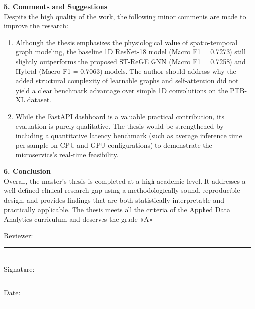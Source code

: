 \documentclass[12pt,a4paper]{article}
\begin{document}
\noindent
\textbf{5. Comments and Suggestions} \\
Despite the high quality of the work, the following minor comments are made to improve the research:
\begin{enumerate}
    \item Although the thesis emphasizes the physiological value of spatio-temporal graph modeling, the baseline 1D ResNet-18 model (Macro F1 = 0.7273) still slightly outperforms the proposed ST-ReGE GNN (Macro F1 = 0.7258) and Hybrid (Macro F1 = 0.7063) models. The author should address why the added structural complexity of learnable graphs and self-attention did not yield a clear benchmark advantage over simple 1D convolutions on the PTB-XL dataset.
    \item While the FastAPI dashboard is a valuable practical contribution, its evaluation is purely qualitative. The thesis would be strengthened by including a quantitative latency benchmark (such as average inference time per sample on CPU and GPU configurations) to demonstrate the microservice's real-time feasibility.
\end{enumerate}
\vspace{1.5em}

\noindent
\textbf{6. Conclusion} \\
Overall, the master's thesis is completed at a high academic level. It addresses a well-defined clinical research gap using a methodologically sound, reproducible design, and provides findings that are both statistically interpretable and practically applicable. The thesis meets all the criteria of the Applied Data Analytics curriculum and deserves the grade «A».

\vspace{3em}
\noindent
Reviewer: \rule{8cm}{0.5pt} \\

\vspace{1.5em}
\noindent
Signature: \rule{4cm}{0.5pt} \hfill Date: \rule{4cm}{0.5pt}
\end{document}
